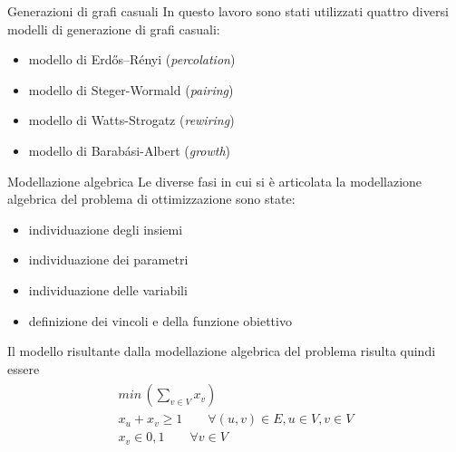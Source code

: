 \documentclass[a4paper]{beamer}
\begin{document}
\begin{frame}{Generazioni di grafi casuali}
In questo lavoro sono stati utilizzati quattro diversi modelli di generazione di grafi casuali:
\vfill
\begin{itemize}
\item modello di Erdős–Rényi (\textit{percolation})
\vfill
\item modello di Steger-Wormald (\textit{pairing})
\vfill
\item modello di Watts-Strogatz (\textit{rewiring})
\vfill
\item modello di Barabási-Albert (\textit{growth})
\end{itemize}
\vfill
\end{frame}

\renewcommand{\raggedright}{\leftskip=0pt \rightskip=0pt plus 0cm}

\begin{frame}{Modellazione algebrica}
Le diverse fasi in cui si è articolata la modellazione algebrica del problema di ottimizzazione sono state:
\begin{itemize}
\item individuazione degli insiemi
\item individuazione dei parametri
\item individuazione delle variabili
\item definizione dei vincoli e della funzione obiettivo
\end{itemize}
\vfill
Il modello risultante dalla modellazione algebrica del problema risulta quindi essere
\begin{align*}
	\begin{array}{l}
      min\, (\sum_{v \in V} x_v)\\
      x_u + x_v \geq 1  \qquad \forall (u,v) \in E,  u \in V, v \in V \\
      x_v \in {0,1}  \qquad \forall v \in V 
    \end{array}
\end{align*} 
\end{frame}
\end{document}
